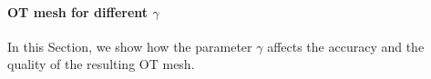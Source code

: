 \documentclass[a4paper,11pt]{article}
\begin{document}
{\begin{figure}[h!]
{}
\end{figure}

\clearpage
\newpage


\paragraph{OT mesh for different $\gamma$}

In this Section, we show how the parameter $\gamma$ affects the accuracy and the quality of the resulting OT mesh. 


}
\end{document}
